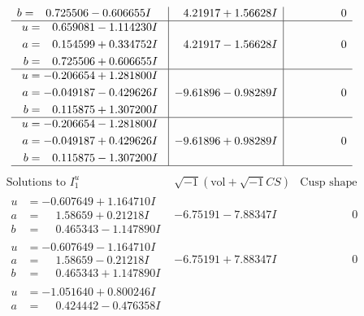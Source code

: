 \documentclass[1p]{elsarticle_modified}
\theoremstyle{definition}
\newcommand{\I}{\sqrt{-1}}
\begin{document}
$$\begin{array}{c|c|c}
\begin{aligned}
b &= \phantom{-}0.725506 - 0.606655 I\end{aligned}
 & \phantom{-}4.21917 + 1.56628 I & \phantom{-0.000000 } 0 \\ \hline\begin{aligned}
u &= \phantom{-}0.659081 - 1.114230 I \\
a &= \phantom{-}0.154599 + 0.334752 I \\
b &= \phantom{-}0.725506 + 0.606655 I\end{aligned}
 & \phantom{-}4.21917 - 1.56628 I & \phantom{-0.000000 } 0 \\ \hline\begin{aligned}
u &= -0.206654 + 1.281800 I \\
a &= -0.049187 - 0.429626 I \\
b &= \phantom{-}0.115875 + 1.307200 I\end{aligned}
 & -9.61896 - 0.98289 I & \phantom{-0.000000 } 0 \\ \hline\begin{aligned}
u &= -0.206654 - 1.281800 I \\
a &= -0.049187 + 0.429626 I \\
b &= \phantom{-}0.115875 - 1.307200 I\end{aligned}
 & -9.61896 + 0.98289 I & \phantom{-0.000000 } 0\\
 \hline 
 \end{array}$$\newpage$$\begin{array}{c|c|c}  
\text{Solutions to }I^u_{1}& \I (\text{vol} + \sqrt{-1}CS) & \text{Cusp shape}\\
 \hline 
\begin{aligned}
u &= -0.607649 + 1.164710 I \\
a &= \phantom{-}1.58659 + 0.21218 I \\
b &= \phantom{-}0.465343 - 1.147890 I\end{aligned}
 & -6.75191 - 7.88347 I & \phantom{-0.000000 } 0 \\ \hline\begin{aligned}
u &= -0.607649 - 1.164710 I \\
a &= \phantom{-}1.58659 - 0.21218 I \\
b &= \phantom{-}0.465343 + 1.147890 I\end{aligned}
 & -6.75191 + 7.88347 I & \phantom{-0.000000 } 0 \\ \hline\begin{aligned}
u &= -1.051640 + 0.800246 I \\
a &= \phantom{-}0.424442 - 0.476358 I \\

\end{aligned}
\end{array}$$
\end{document}
